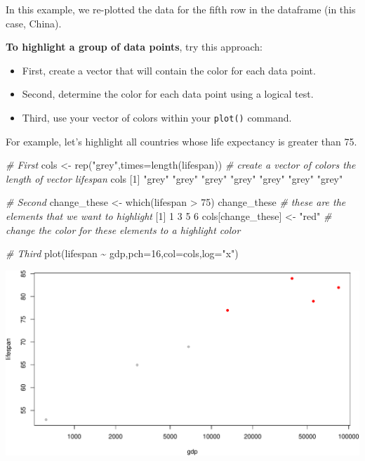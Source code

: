 \documentclass[
]{book}
\newenvironment{Shaded}{\begin{snugshade}}{\end{snugshade}}
\newcommand{\AttributeTok}[1]{\textcolor[rgb]{0.77,0.63,0.00}{#1}}
\newcommand{\CommentTok}[1]{\textcolor[rgb]{0.56,0.35,0.01}{\textit{#1}}}
\newcommand{\DecValTok}[1]{\textcolor[rgb]{0.00,0.00,0.81}{#1}}
\newcommand{\FunctionTok}[1]{\textcolor[rgb]{0.00,0.00,0.00}{#1}}
\newcommand{\NormalTok}[1]{#1}
\newcommand{\OtherTok}[1]{\textcolor[rgb]{0.56,0.35,0.01}{#1}}
\newcommand{\SpecialCharTok}[1]{\textcolor[rgb]{0.00,0.00,0.00}{#1}}
\newcommand{\StringTok}[1]{\textcolor[rgb]{0.31,0.60,0.02}{#1}}
\begin{document}
In this example, we re-plotted the data for the fifth row in the dataframe (in this case, China).

\textbf{To highlight a group of data points}, try this approach:

\begin{itemize}
\item
  First, create a vector that will contain the color for each data point.
\item
  Second, determine the color for each data point using a logical test.
\item
  Third, use your vector of colors within your \texttt{plot()} command.
\end{itemize}

For example, let's highlight all countries whose life expectancy is greater than 75.

\begin{Shaded}
\begin{Highlighting}[]
\CommentTok{\# First}
\NormalTok{cols }\OtherTok{\textless{}{-}} \FunctionTok{rep}\NormalTok{(}\StringTok{"grey"}\NormalTok{,}\AttributeTok{times=}\FunctionTok{length}\NormalTok{(lifespan)) }\CommentTok{\# create a vector of colors the length of vector \textasciigrave{}lifespan\textasciigrave{}}
\NormalTok{cols}
\NormalTok{[}\DecValTok{1}\NormalTok{] }\StringTok{"grey"} \StringTok{"grey"} \StringTok{"grey"} \StringTok{"grey"} \StringTok{"grey"} \StringTok{"grey"} \StringTok{"grey"}

\CommentTok{\# Second}
\NormalTok{change\_these }\OtherTok{\textless{}{-}} \FunctionTok{which}\NormalTok{(lifespan }\SpecialCharTok{\textgreater{}} \DecValTok{75}\NormalTok{) }
\NormalTok{change\_these }\CommentTok{\# these are the elements that we want to highlight}
\NormalTok{[}\DecValTok{1}\NormalTok{] }\DecValTok{1} \DecValTok{3} \DecValTok{5} \DecValTok{6}
\NormalTok{cols[change\_these] }\OtherTok{\textless{}{-}} \StringTok{"red"}  \CommentTok{\# change the color for these elements to a highlight color}

\CommentTok{\# Third}
\FunctionTok{plot}\NormalTok{(lifespan }\SpecialCharTok{\textasciitilde{}}\NormalTok{ gdp,}\AttributeTok{pch=}\DecValTok{16}\NormalTok{,}\AttributeTok{col=}\NormalTok{cols,}\AttributeTok{log=}\StringTok{"x"}\NormalTok{)}
\end{Highlighting}
\end{Shaded}

\includegraphics{figures/unnamed-chunk-121-1.pdf}
\end{document}
